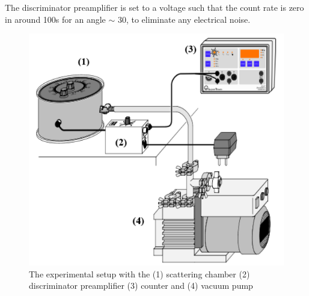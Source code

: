 The discriminator preamplifier is set to a voltage such that the count rate is zero in around 100s for an angle $\sim$ 30, to eliminate any electrical noise.

\begin{figure}
    \centering
    \includegraphics[width=1\columnwidth]{images/expt.png}
    \caption{The experimental setup with the (1) scattering chamber (2) discriminator preamplifier (3) counter and (4) vacuum pump}
    \label{3}
\end{figure}
